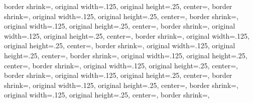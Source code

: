 {{%
	border shrink=\pgfpageoptionborder,%
	original width=.125\pgfpageoptionheight,%
	original height=.25\pgfpageoptionwidth,%
	center=\pgfpoint{0pt}{.375\pgfphysicalheight},%
}%
{%
	border shrink=\pgfpageoptionborder,%
	original width=.125\pgfpageoptionheight,%
	original height=.25\pgfpageoptionwidth,%
	center=\pgfpoint{.25\pgfphysicalwidth}{.375\pgfphysicalheight},%
}%
{%
	border shrink=\pgfpageoptionborder,%
	original width=.125\pgfpageoptionheight,%
	original height=.25\pgfpageoptionwidth,%
	center=\pgfpoint{.5\pgfphysicalwidth}{.375\pgfphysicalheight},%
}%
{%
	border shrink=\pgfpageoptionborder,%
	original width=.125\pgfpageoptionheight,%
	original height=.25\pgfpageoptionwidth,%
	center=\pgfpoint{.75\pgfphysicalwidth}{.375\pgfphysicalheight},%
}%
%
%
%
{%
	border shrink=\pgfpageoptionborder,%
	original width=.125\pgfpageoptionheight,%
	original height=.25\pgfpageoptionwidth,%
	center=\pgfpoint{0pt}{.25\pgfphysicalheight},%
}%
{%
	border shrink=\pgfpageoptionborder,%
	original width=.125\pgfpageoptionheight,%
	original height=.25\pgfpageoptionwidth,%
	center=\pgfpoint{.25\pgfphysicalwidth}{.25\pgfphysicalheight},%
}%
{%
	border shrink=\pgfpageoptionborder,%
	original width=.125\pgfpageoptionheight,%
	original height=.25\pgfpageoptionwidth,%
	center=\pgfpoint{.5\pgfphysicalwidth}{.25\pgfphysicalheight},%
}%
{%
	border shrink=\pgfpageoptionborder,%
	original width=.125\pgfpageoptionheight,%
	original height=.25\pgfpageoptionwidth,%
	center=\pgfpoint{.75\pgfphysicalwidth}{.25\pgfphysicalheight},%
}%
%
%
%
{%
	border shrink=\pgfpageoptionborder,%
	original width=.125\pgfpageoptionheight,%
	original height=.25\pgfpageoptionwidth,%
	center=\pgfpoint{0pt}{.125\pgfphysicalheight},%
}%
{%
	border shrink=\pgfpageoptionborder,%
	original width=.125\pgfpageoptionheight,%
	original height=.25\pgfpageoptionwidth,%
	center=\pgfpoint{.25\pgfphysicalwidth}{.125\pgfphysicalheight},%
}%
{%
	border shrink=\pgfpageoptionborder,%
	original width=.125\pgfpageoptionheight,%
	original height=.25\pgfpageoptionwidth,%
	center=\pgfpoint{.5\pgfphysicalwidth}{.125\pgfphysicalheight},%
}%
{%
	border shrink=\pgfpageoptionborder,%
}}
